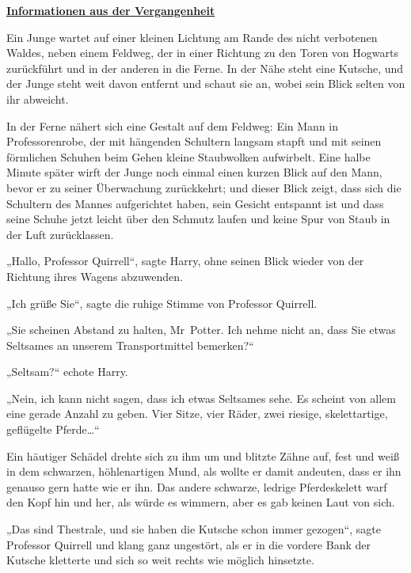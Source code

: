 

\hypertarget{informationen-aus-der-vergangenheit}{%

\textbf{\uline{Informationen aus der Vergangenheit}}

Ein Junge wartet auf einer kleinen Lichtung am Rande des nicht verbotenen Waldes, neben einem Feldweg, der in einer Richtung zu den Toren von Hogwarts zurückführt und in der anderen in die Ferne. In der Nähe steht eine Kutsche, und der Junge steht weit davon entfernt und schaut sie an, wobei sein Blick selten von ihr abweicht.

In der Ferne nähert sich eine Gestalt auf dem Feldweg: Ein Mann in Professorenrobe, der mit hängenden Schultern langsam stapft und mit seinen förmlichen Schuhen beim Gehen kleine Staubwolken aufwirbelt. Eine halbe Minute später wirft der Junge noch einmal einen kurzen Blick auf den Mann, bevor er zu seiner Überwachung zurückkehrt; und dieser Blick zeigt, dass sich die Schultern des Mannes aufgerichtet haben, sein Gesicht entspannt ist und dass seine Schuhe jetzt leicht über den Schmutz laufen und keine Spur von Staub in der Luft zurücklassen.

„Hallo, Professor Quirrell“, sagte Harry, ohne seinen Blick wieder von der Richtung ihres Wagens abzuwenden.

„Ich grüße Sie“, sagte die ruhige Stimme von Professor Quirrell.

„Sie scheinen Abstand zu halten, Mr~Potter. Ich nehme nicht an, dass Sie etwas Seltsames an unserem Transportmittel bemerken?“

„Seltsam?“ echote Harry.

„Nein, ich kann nicht sagen, dass ich etwas Seltsames sehe. Es scheint von allem eine gerade Anzahl zu geben. Vier Sitze, vier Räder, zwei riesige, skelettartige, geflügelte Pferde…“

Ein häutiger Schädel drehte sich zu ihm um und blitzte Zähne auf, fest und weiß in dem schwarzen, höhlenartigen Mund, als wollte er damit andeuten, dass er ihn genauso gern hatte wie er ihn. Das andere schwarze, ledrige Pferdeskelett warf den Kopf hin und her, als würde es wimmern, aber es gab keinen Laut von sich.

„Das sind Thestrale, und sie haben die Kutsche schon immer gezogen“, sagte Professor Quirrell und klang ganz ungestört, als er in die vordere Bank der Kutsche kletterte und sich so weit rechts wie möglich hinsetzte.

}
